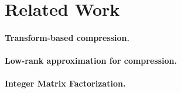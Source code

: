 \section{Related Work} \label{sec: related work}

\paragraph{Transform-based compression.} 

\paragraph{Low-rank approximation for compression.} 

\paragraph{Integer Matrix Factorization.} 
